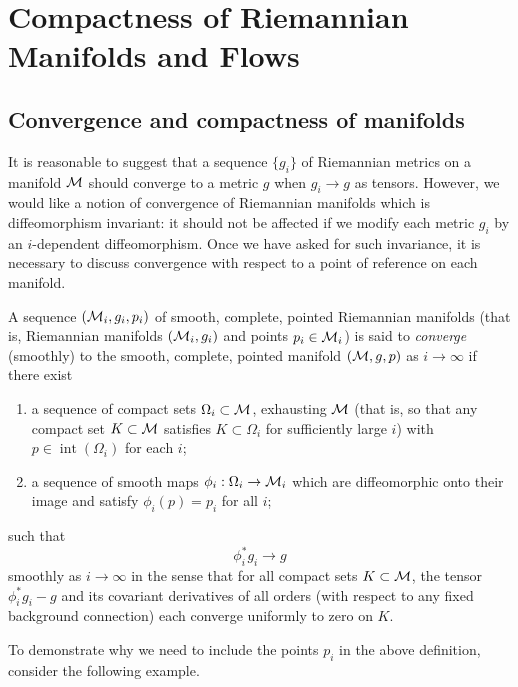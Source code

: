\chapter{Compactness of Riemannian Manifolds and Flows}

\section{Convergence and compactness of manifolds}

It is reasonable to suggest that a sequence $\{g_i\}$ of Riemannian metrics on
a manifold $\mathcal{M}$ should converge to a metric $g$ when $g_i \to g$ as tensors.
However, we would like a notion of convergence of Riemannian manifolds which is
diffeomorphism invariant: it should not be affected if we modify each metric
$g_i$ by an $i$-dependent diffeomorphism. Once we have asked for such
invariance, it is necessary to discuss convergence with respect to a point of
reference on each manifold.

\begin{definition}
\label{topping-ch7-pointed-cheeger-gromov-convergence}
A sequence $(\mathcal{M}_i,g_i,p_i)$ of smooth, complete, pointed Riemannian manifolds
(that is, Riemannian manifolds $(\mathcal{M}_i,g_i)$ and points $p_i \in \mathcal{M}_i$) is said
to \emph{converge} (smoothly) to the smooth, complete, pointed manifold
$(\mathcal{M},g,p)$ as $i \to \infty$ if there exist
\begin{enumerate}
\item[(i)] a sequence of compact sets $\Omega_i \subset \mathcal{M}$, exhausting
$\mathcal{M}$ (that is, so that any compact set $K \subset \mathcal{M}$ satisfies
$K \subset \Omega_i$ for sufficiently large $i$) with $p \in \operatorname{int}(\Omega_i)$
for each $i$;
\item[(ii)] a sequence of smooth maps $\phi_i : \Omega_i \to \mathcal{M}_i$ which are
diffeomorphic onto their image and satisfy $\phi_i(p) = p_i$ for all $i$;
\end{enumerate}
such that
\[
\phi_i^* g_i \to g
\]
smoothly as $i \to \infty$ in the sense that for all compact sets
$K \subset \mathcal{M}$, the tensor $\phi_i^* g_i - g$ and its covariant derivatives of
all orders (with respect to any fixed background connection) each converge
uniformly to zero on $K$.
\end{definition}

To demonstrate why we need to include the points $p_i$ in the above
definition, consider the following example.

